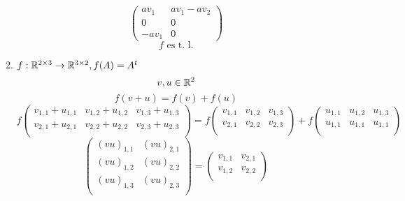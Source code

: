 \documentclass[../practica.root.tex]{subfiles}
\begin{document}
\begin{enumerate}
\begin{enumerate}
\[\begin{pmatrix}
                            av_1  & av_1 - av_2 \\
                            0     & 0           \\
                            -av_1 & 0
                        \end{pmatrix}
                    \]
                    \[ \boxed{f \text{ es t. l.}} \]
              \item \( f: \mathbb{R}^{2\times3} \to \mathbb{R}^{3\times2}, f(A) = A^t \)
                    \[ v, u \in \mathbb{R}^2 \]
                    \[ f(v + u) = f(v) + f(u) \]
                    \[
                        f
                        \begin{pmatrix}
                            v_{1,1} + u_{1,1} & v_{1,2} + u_{1,2} & v_{1,3} + u_{1,3} \\
                            v_{2,1} + u_{2,1} & v_{2,2} + u_{2,2} & v_{2,3} + u_{2,3} \\
                        \end{pmatrix}
                        =
                        f
                        \begin{pmatrix}
                            v_{1,1} & v_{1,2} & v_{1,3} \\
                            v_{2,1} & v_{2,2} & v_{2,3} \\
                        \end{pmatrix}
                        +
                        f
                        \begin{pmatrix}
                            u_{1,1} & u_{1,2} & u_{1,3} \\
                            u_{1,1} & u_{1,1} & u_{1,1} \\
                        \end{pmatrix}
                    \] \[
                        \begin{pmatrix}
                            (vu)_{1,1} & (vu)_{2,1} \\
                            (vu)_{1,2} & (vu)_{2,2} \\
                            (vu)_{1,3} & (vu)_{2,3} \\
                        \end{pmatrix}
                        =
                        \begin{pmatrix}
                            v_{1,1} & v_{2,1} \\
                            v_{1,2} & v_{2,2} \\

\end{pmatrix}\]
\end{enumerate}
\end{enumerate}
\end{document}
